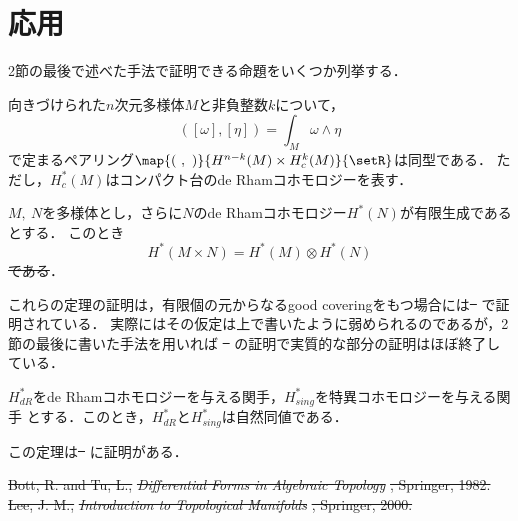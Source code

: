 \documentclass[uplatex]{jsarticle}
\providecommand{\DIFadd}[1]{{\protect\color{blue}\uwave{#1}}} %
\providecommand{\DIFdel}[1]{{\protect\color{red}\sout{#1}}}                      %
\providecommand{\DIFaddbegin}{} %
\providecommand{\DIFaddend}{} %
\providecommand{\DIFdelbegin}{} %
\providecommand{\DIFdelend}{} %
\begin{document}
\section{応用}
2節の最後で述べた手法で証明できる命題をいくつか列挙する．

\begin{theorem}[de RhamコホモロジーのPoincar\'{e}双対]
  向きづけられた$n$次元多様体$M$と非負整数$k$について，
    \[([\omega],\DIFaddbegin [\DIFaddend \eta\DIFaddbegin ]\DIFaddend )=\int_M \omega\wedge \eta\]
  で定まるペアリング$\map{(\ ,\ )}{H^{n-k}(M)\times H^k_c(M)}{\setR}$は同型である．
  ただし，$H^\ast_c(M)$はコンパクト台のde Rhamコホモロジーを表す．
\end{theorem}

\begin{theorem}
  $M,\ N$を多様体とし，さらに$N$のde Rhamコホモロジー$H^\ast(N)$が有限生成であるとする．
  このとき
    \[H^\ast(M\times N)=H^\ast(M)\otimes H^\ast(N)\]
  \DIFdelbegin \DIFdel{である}\DIFdelend \DIFaddbegin \DIFadd{が成立する}\DIFaddend ．
\end{theorem}

これらの定理の証明は，有限個の元からなるgood coveringをもつ場合には\DIFdelbegin \DIFdel{\mbox{%
\cite{Bott-Tu}}\hspace{0pt}%
}\DIFdelend \DIFaddbegin \DIFadd{\mbox{%
\cite{Bott--Tu}}\hspace{0pt}%
}\DIFaddend で証明されている．
実際にはその仮定は上で書いたように弱められるのであるが，2節の最後に書いた手法を用いれば
\DIFdelbegin \DIFdel{\mbox{%
\cite{Bott-Tu}}\hspace{0pt}%
}\DIFdelend \DIFaddbegin \DIFadd{\mbox{%
\cite{Bott--Tu}}\hspace{0pt}%
}\DIFaddend の証明で実質的な部分の証明はほぼ終了している．

\begin{theorem}
  $H_{dR}^\ast$をde Rhamコホモロジーを与える関手，$H_{sing}^\ast$を特異コホモロジーを与える関手
  とする．このとき，$H_{dR}^\ast$と$H_{sing}^\ast$は自然同値である．
\end{theorem}

この定理は\DIFdelbegin \DIFdel{\mbox{%
\cite{Lee}}\hspace{0pt}%
}\DIFdelend \DIFaddbegin \DIFadd{\mbox{%
\cite{LeeSmooth}}\hspace{0pt}%
}\DIFaddend に証明がある．

\DIFdelbegin %
\DIFdel{Bott, R. and Tu, L., 
    }\textit{\DIFdel{Differential Forms in Algebraic Topology}}%
\DIFdel{, Springer, 1982.
  }%
\DIFdel{Lee, J. M., 
    }\textit{\DIFdel{Introduction to Topological Manifolds}}%
\DIFdel{, Springer, 2000.
  }\DIFdelend \DIFaddbegin 
\DIFaddend 

\DIFdelbegin %
\DIFdelend \DIFaddbegin 
\DIFaddend 
\end{document}
